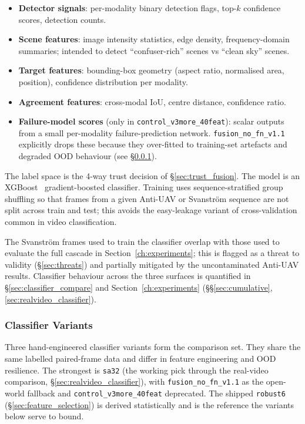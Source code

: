\begin{itemize}
    \item \textbf{Detector signals}: per-modality binary detection flags, top-$k$ confidence scores, detection counts.
    \item \textbf{Scene features}: image intensity statistics, edge density, frequency-domain summaries; intended to detect ``confuser-rich'' scenes vs ``clean sky'' scenes.
    \item \textbf{Target features}: bounding-box geometry (aspect ratio, normalised area, position), confidence distribution per modality.
    \item \textbf{Agreement features}: cross-modal IoU, centre distance, confidence ratio.
    \item \textbf{Failure-model scores} (only in \texttt{control\_v3more\_40feat}): scalar outputs from a small per-modality failure-prediction network. \texttt{fusion\_no\_fn\_v1.1} explicitly drops these because they over-fitted to training-set artefacts and degraded OOD behaviour (see \S\ref{sec:classifier_variants}).
\end{itemize}

The label space is the 4-way trust decision of \S\ref{sec:trust_fusion}. The model is an XGBoost~\cite{chen2016xgboost} gradient-boosted classifier. Training uses sequence-stratified group shuffling so that frames from a given Anti-UAV or Svanstr\"om sequence are not split across train and test; this avoids the easy-leakage variant of cross-validation common in video classification.

The Svanstr\"om frames used to train the classifier overlap with those used to evaluate the full cascade in Section~\ref{ch:experiments}; this is flagged as a threat to validity (\S\ref{sec:threats}) and partially mitigated by the uncontaminated Anti-UAV results. Classifier behaviour across the three surfaces is quantified in \S\ref{sec:classifier_compare} and Section~\ref{ch:experiments} (\S\S\ref{sec:cumulative}, \ref{sec:realvideo_classifier}).

\subsubsection{Classifier Variants}
\label{sec:classifier_variants}

Three hand-engineered classifier variants form the comparison set. They share the same labelled paired-frame data and differ in feature engineering and OOD resilience. The strongest is \texttt{sa32} (the working pick through the real-video comparison, \S\ref{sec:realvideo_classifier}), with \texttt{fusion\_no\_fn\_v1.1} as the open-world fallback and \texttt{control\_v3more\_40feat} deprecated. The shipped \texttt{robust6} (\S\ref{sec:feature_selection}) is derived statistically and is the reference the variants below serve to bound.

